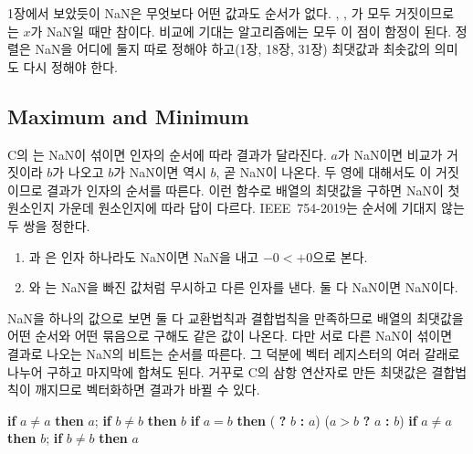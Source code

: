 1장에서 보았듯이 NaN은 무엇보다 어떤 값과도 순서가 없다. , , 가 모두 거짓이므로 는 $x$가 NaN일 때만 참이다. 비교에 기대는 알고리즘에는 모두 이 점이 함정이 된다. 정렬은 NaN을 어디에 둘지 따로 정해야 하고(1장, 18장, 31장) 최댓값과 최솟값의 의미도 다시 정해야 한다.

\subsection{Maximum and Minimum}

C의 는 NaN이 섞이면 인자의 순서에 따라 결과가 달라진다. $a$가 NaN이면 비교가 거짓이라 $b$가 나오고 $b$가 NaN이면 역시 $b$, 곧 NaN이 나온다. 두 영에 대해서도 이 거짓이므로 결과가 인자의 순서를 따른다. 이런 함수로 배열의 최댓값을 구하면 NaN이 첫 원소인지 가운데 원소인지에 따라 답이 다르다. IEEE~754-2019는 순서에 기대지 않는 두 쌍을 정한다\cite{ieee754-2019}.
\begin{enumerate}
\item {}과 은 인자 하나라도 NaN이면 NaN을 내고 $-0<+0$으로 본다.
\item {}와 는 NaN을 빠진 값처럼 무시하고 다른 인자를 낸다. 둘 다 NaN이면 NaN이다.
\end{enumerate}
NaN을 하나의 값으로 보면 둘 다 교환법칙과 결합법칙을 만족하므로 배열의 최댓값을 어떤 순서와 어떤 묶음으로 구해도 같은 값이 나온다. 다만 서로 다른 NaN이 섞이면 결과로 나오는 NaN의 비트는 순서를 따른다. 그 덕분에 벡터 레지스터의 여러 갈래로 나누어 구하고 마지막에 합쳐도 된다. 거꾸로 C의 삼항 연산자로 만든 최댓값은 결합법칙이 깨지므로 벡터화하면 결과가 바뀔 수 있다.

\begin{algorithm}[htbp]
\begin{algorithmic}[1]
 
  \State \textbf{if} $a\ne a$ \textbf{then} \Return $a$; \textbf{if} $b\ne b$ \textbf{then} \Return $b$
  \State \textbf{if} $a=b$ \textbf{then} \Return ( \textbf{?} $b$ \textbf{:} $a$) 
  \State \Return ($a>b$ \textbf{?} $a$ \textbf{:} $b$)
\EndFunction
{} 
  \State \textbf{if} $a\ne a$ \textbf{then} \Return $b$; \textbf{if} $b\ne b$ \textbf{then} \Return $a$
  \State \Return {}
\EndFunction
\end{algorithmic}
\caption{NaN과 부호 있는 영을 정한 최댓값 (stardust 의 , )}
\label{alg:fmax-nan}
\end{algorithm}

